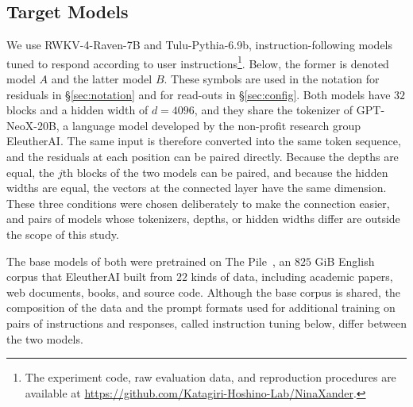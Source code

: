 \documentclass[conference]{IEEEtran}
\begin{document}
\subsection{Target Models}
We use RWKV-4-Raven-7B and Tulu-Pythia-6.9b, instruction-following models tuned to respond according to user
instructions\footnote{The experiment code, raw evaluation data, and reproduction procedures are available at \url{https://github.com/Katagiri-Hoshino-Lab/NinaXander}.}.
Below, the former is denoted model $A$ and the latter model $B$. These symbols are used in the notation for residuals in
\S\ref{sec:notation} and for read-outs in \S\ref{sec:config}. Both models have $32$ blocks and a hidden width of $d{=}4096$, and
they share the tokenizer of GPT-NeoX-20B, a language model developed by the non-profit research group EleutherAI.
The same input is therefore converted into the same token sequence, and the residuals at each position can be paired directly.
Because the depths are equal, the $j$th blocks of the two models can be paired, and because the hidden widths are equal, the vectors
at the connected layer have the same dimension. These three conditions were chosen deliberately to make the connection easier, and
pairs of models whose tokenizers, depths, or hidden widths differ are outside the scope of this study.

The base models of both were pretrained on The Pile~\cite{gao2020pile}, an $825$ GiB English corpus that EleutherAI built from $22$ kinds of data, including academic papers, web documents, books,
and source code. Although the base corpus is shared, the composition of the data and the prompt formats used for additional training on pairs of
instructions and responses, called instruction tuning below, differ between the two models.
\end{document}
